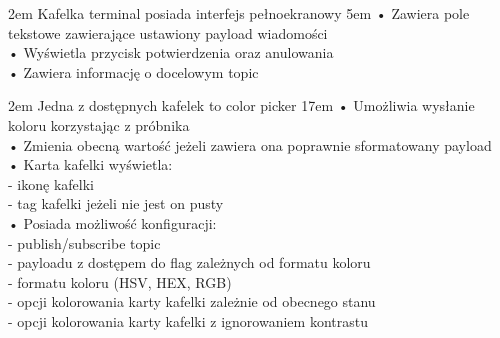 {2em}{
    Kafelka terminal posiada interfejs pełnoekranowy
}
{5em}{
    • Zawiera pole tekstowe zawierające ustawiony payload wiadomości\\
    • Wyświetla przycisk potwierdzenia oraz anulowania\\
    • Zawiera informację o docelowym topic
}

{2em}{
    Jedna z dostępnych kafelek to color picker
}
{17em}{
    • Umożliwia wysłanie koloru korzystając z próbnika\\
    • Zmienia obecną wartość jeżeli zawiera ona poprawnie sformatowany payload\\

    • Karta kafelki wyświetla:\\
    - ikonę kafelki\\
    - tag kafelki jeżeli nie jest on pusty\\

    • Posiada możliwość konfiguracji:\\
    - publish/subscribe topic\\
    - payloadu z dostępem do flag zależnych od formatu koloru\\
    - formatu koloru (HSV, HEX, RGB)\\
    - opcji kolorowania karty kafelki zależnie od obecnego stanu\\
    - opcji kolorowania karty kafelki z ignorowaniem kontrastu
}

